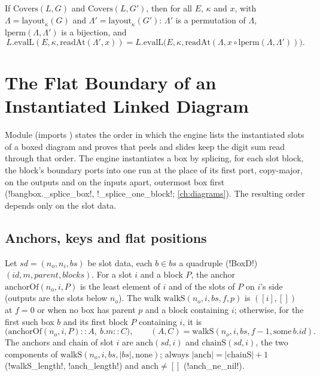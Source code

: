 \begin{theorem}\label{thm:lean-sym-regroup}
If $\mathrm{Covers}(L,G)$ and $\mathrm{Covers}(L,G')$, then for all $E$, $\kappa$ and $x$, with $\Lambda=\mathrm{layout}_\kappa(G)$ and $\Lambda'=\mathrm{layout}_\kappa(G')$: $\Lambda'$ is a permutation of $\Lambda$, $\mathrm{lperm}(\Lambda,\Lambda')$ is a bijection, and
\[
L.\mathrm{evalL}(E,\kappa,\mathrm{readAt}(\Lambda',x))=L.\mathrm{evalL}\bigl(E,\kappa,\mathrm{readAt}(\Lambda,x\circ\mathrm{lperm}(\Lambda,\Lambda'))\bigr).
\]
\end{theorem}

\section{The Flat Boundary of an Instantiated Linked Diagram}\label{sec:lean-sym-splice}

Module  (imports ) states the order in which the engine lists the instantiated slots of a boxed diagram and proves that peels and slides keep the digit sum read through that order. The engine instantiates a box by splicing, for each slot block, the block's boundary ports into one run at the place of its first port, copy-major, on the outputs and on the inputs apart, outermost box first (\py!bangbox._splice_box!, \py!_splice_one_block!; \cref{ch:diagrams}). The resulting order depends only on the slot data.

\subsection{Anchors, keys and flat positions}

\begin{definition}[Anchors]\label{def:lean-sym-anchors}
Let $\mathit{sd}=(n_o,n_i,bs)$ be slot data, each $b\in bs$ a quadruple (\lean!BoxD!) $(\mathit{id},m,\mathit{parent},\mathit{blocks})$. For a slot $i$ and a block $P$, the anchor $\mathrm{anchorOf}(n_o,i,P)$ is the least element of $i$ and of the slots of $P$ on $i$'s side (outputs are the slots below $n_o$). The walk $\mathrm{walkS}(n_o,i,bs,f,p)$ is $([i],[])$ at $f=0$ or when no box has parent $p$ and a block containing $i$; otherwise, for the first such box $b$ and its first block $P$ containing $i$, it is
\[
\bigl(\mathrm{anchorOf}(n_o,i,P)\mathbin{::}A,\ b.m\mathbin{::}C\bigr),\qquad (A,C)=\mathrm{walkS}(n_o,i,bs,f-1,\mathrm{some}\,b.\mathit{id}).
\]
The anchors and chain of slot $i$ are $\mathrm{anch}(\mathit{sd},i)$ and $\mathrm{chainS}(\mathit{sd},i)$, the two components of $\mathrm{walkS}(n_o,i,bs,|bs|,\mathrm{none})$; always $|\mathrm{anch}|=|\mathrm{chainS}|+1$ (\lean!walkS_length!, \lean!anch_length!) and $\mathrm{anch}\neq[]$ (\lean!anch_ne_nil!).
\end{definition}

